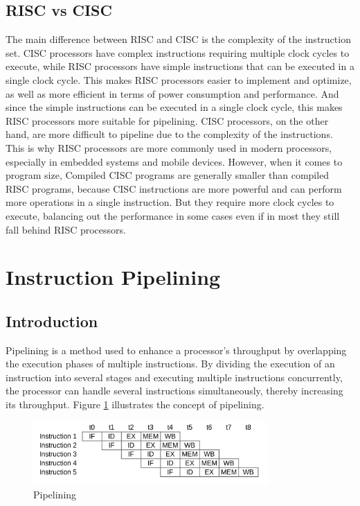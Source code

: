 \subsection{RISC vs CISC}
The main difference between RISC and CISC is the complexity of the instruction set. CISC processors have complex instructions requiring multiple clock cycles to execute, while RISC processors have simple instructions that can be executed in a single clock cycle. This makes RISC processors easier to implement and optimize, as well as more efficient in terms of power consumption and performance. And since the simple instructions can be executed in a single clock cycle, this makes RISC processors more suitable for pipelining. CISC processors, on the other hand, are more difficult to pipeline due to the complexity of the instructions. This is why RISC processors are more commonly used in modern processors, especially in embedded systems and mobile devices. However, when it comes to program size, Compiled CISC programs are generally smaller than compiled RISC programs, because CISC instructions are more powerful and can perform more operations in a single instruction. But they require more clock cycles to execute, balancing out the performance in some cases even if in most they still fall behind RISC processors\cite{patterson1994computer}.

\section {Instruction Pipelining}\label{sec:pipelining}

\subsection {Introduction}\label{sec:pipelining_intro}
Pipelining is a method used to enhance a processor's throughput by overlapping the execution phases of multiple instructions. By dividing the execution of an instruction into several stages and executing multiple instructions concurrently, the processor can handle several instructions simultaneously, thereby increasing its throughput\cite{olanrewaju2017design}. Figure \ref{fig:pipeline} illustrates the concept of pipelining.

\begin{figure}[H]
    \centering
    \includegraphics[width=0.8\textwidth]{assets/images/pipeline.png}
    \caption{Pipelining} 
    \label{fig:pipeline} 
\end{figure}

